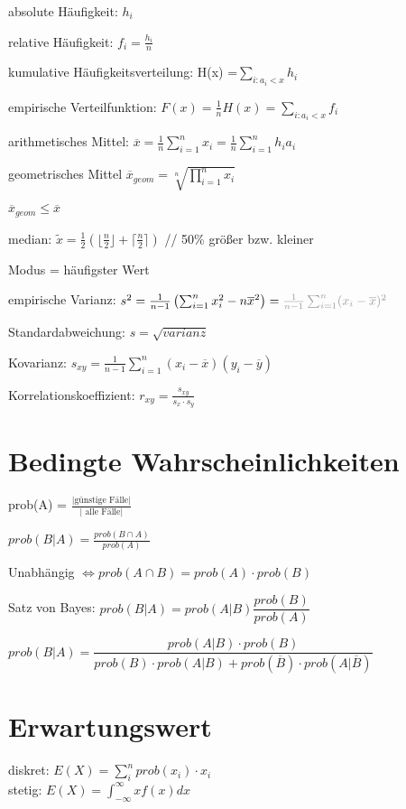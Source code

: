 absolute Häufigkeit: $h_i$

relative Häufigkeit: $f_i= \frac{h_i}{n}$

kumulative Häufigkeitsverteilung: H(x) =$\sum_{i:a_i < x} h_i$

empirische Verteilfunktion: $F(x) =  \frac{1}{n} H(x) = \sum_{i:a_i < x} f_i$

arithmetisches Mittel: $\overline{x} = \frac{1}{n} \sum_{i=1}^n x_i = \frac{1}{n} \sum_{i=1}^n h_i a_i $

geometrisches Mittel $\overline{x}_{geom} = \sqrt[n]{\prod_{i=1}^n x_i}$

$\overline{x}_{geom} \leq \overline{x}$

median:  $\tilde{x} = \frac{1}{2} (\lfloor \frac{n}{2} \rfloor + \lceil \frac{n}{2} \rceil )  $ // 50\% größer bzw. kleiner


Modus = häufigster Wert

empirische Varianz: $s^2  = \frac{1}{n-1}\left(\sum_{i=1}^n x_i^2-n\overline{x}^2\right)= \gray{\frac{1}{n-1}\sum_{i=1}^n(x_i-\overline{x})^2}$

Standardabweichung:  $s = \sqrt{varianz} $

Kovarianz: $s_{xy} = \frac{1}{n-1}\sum_{i=1}^n(x_i-\overline{x})(y_i-\overline{y})$

Korrelationskoeffizient: $r_{xy} = \frac{s_{xy}}{s_x\cdot s_y}$

\section*{Bedingte Wahrscheinlichkeiten}

prob(A) = $\frac{\text{|günstige Fälle|}}{\text{| alle Fälle|}}$

$prob(B|A) = \frac{prob(B \cap A)}{prob(A)}$

Unabhängig $\Leftrightarrow prob(A \cap B)=prob(A)\cdot prob(B)$

Satz von Bayes: $prob(B|A) = prob(A|B)\dfrac{prob(B)}{prob(A)}$

$prob(B|A) = \dfrac{prob(A|B)\cdot prob(B)}{prob(B)\cdot prob(A|B) + prob(\overline{B}) \cdot prob(A|\overline{B}) }$


\section*{Erwartungswert}
diskret: $ E(X) = \sum_i^n prob(x_i)\cdot x_i$\\
stetig: $E(X) = \int_{-\infty}^{\infty}xf(x)dx$\\

